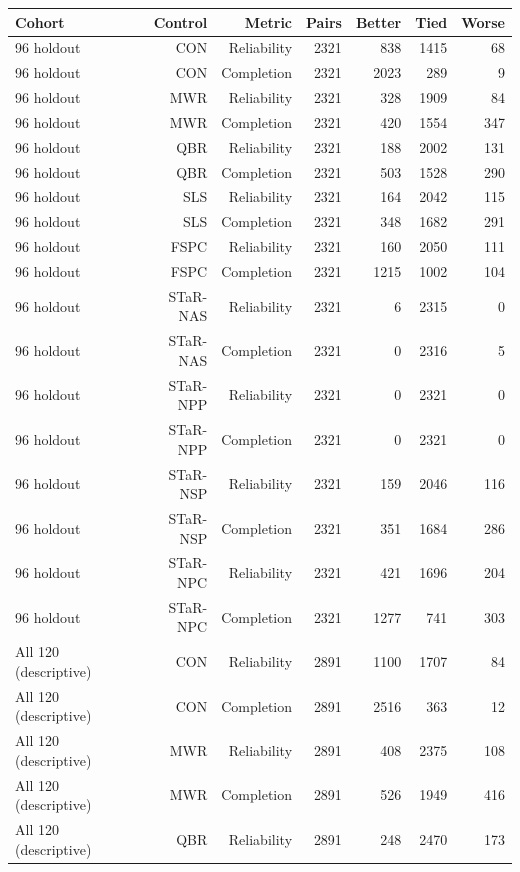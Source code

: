 \begingroup
\small
\setlength{\tabcolsep}{3pt}
\begin{longtable}{@{}lrrrrrr@{}}
\toprule
Cohort & Control & Metric & Pairs & Better & Tied & Worse \\
\midrule
\endhead
96 holdout & CON & Reliability & 2321 & 838 & 1415 & 68 \\
96 holdout & CON & Completion & 2321 & 2023 & 289 & 9 \\
96 holdout & MWR & Reliability & 2321 & 328 & 1909 & 84 \\
96 holdout & MWR & Completion & 2321 & 420 & 1554 & 347 \\
96 holdout & QBR & Reliability & 2321 & 188 & 2002 & 131 \\
96 holdout & QBR & Completion & 2321 & 503 & 1528 & 290 \\
96 holdout & SLS & Reliability & 2321 & 164 & 2042 & 115 \\
96 holdout & SLS & Completion & 2321 & 348 & 1682 & 291 \\
96 holdout & FSPC & Reliability & 2321 & 160 & 2050 & 111 \\
96 holdout & FSPC & Completion & 2321 & 1215 & 1002 & 104 \\
96 holdout & STaR-NAS & Reliability & 2321 & 6 & 2315 & 0 \\
96 holdout & STaR-NAS & Completion & 2321 & 0 & 2316 & 5 \\
96 holdout & STaR-NPP & Reliability & 2321 & 0 & 2321 & 0 \\
96 holdout & STaR-NPP & Completion & 2321 & 0 & 2321 & 0 \\
96 holdout & STaR-NSP & Reliability & 2321 & 159 & 2046 & 116 \\
96 holdout & STaR-NSP & Completion & 2321 & 351 & 1684 & 286 \\
96 holdout & STaR-NPC & Reliability & 2321 & 421 & 1696 & 204 \\
96 holdout & STaR-NPC & Completion & 2321 & 1277 & 741 & 303 \\
All 120 (descriptive) & CON & Reliability & 2891 & 1100 & 1707 & 84 \\
All 120 (descriptive) & CON & Completion & 2891 & 2516 & 363 & 12 \\
All 120 (descriptive) & MWR & Reliability & 2891 & 408 & 2375 & 108 \\
All 120 (descriptive) & MWR & Completion & 2891 & 526 & 1949 & 416 \\
All 120 (descriptive) & QBR & Reliability & 2891 & 248 & 2470 & 173 \\

\end{longtable}
